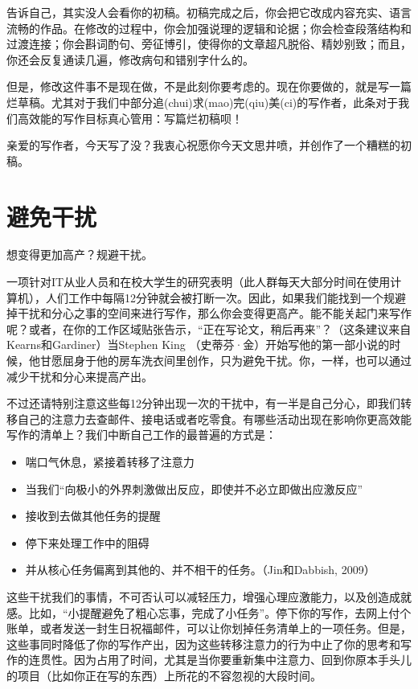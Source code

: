 \documentclass{ctexart}
\begin{document}
告诉自己，其实没人会看你的初稿。初稿完成之后，你会把它改成内容充实、语言流畅的作品。在修改的过程中，你会加强说理的逻辑和论据；你会检查段落结构和过渡连接；你会斟词酌句、旁征博引，使得你的文章超凡脱俗、精妙别致；而且，你还会反复通读几遍，修改病句和错别字什么的。

但是，修改这件事不是现在做，不是此刻你要考虑的。现在你要做的，就是写一篇烂草稿。尤其对于我们中部分追(chui)求(mao)完(qiu)美(ci)的写作者，此条对于我们高效能的写作目标真心管用：写篇烂初稿呗！

亲爱的写作者，今天写了没？我衷心祝愿你今天文思井喷，并创作了一个糟糕的初稿。

\section{避免干扰}
想变得更加高产？规避干扰。

一项针对IT从业人员和在校大学生的研究表明（此人群每天大部分时间在使用计算机），人们工作中每隔12分钟就会被打断一次。因此，如果我们能找到一个规避掉干扰和分心之事的空间来进行写作，那么你会变得更高产。能不能关起门来写作呢？或者，在你的工作区域贴张告示，“正在写论文，稍后再来”？（这条建议来自Kearns和Gardiner）当Stephen King （史蒂芬·金）开始写他的第一部小说的时候，他甘愿屈身于他的房车洗衣间里创作，只为避免干扰。你，一样，也可以通过减少干扰和分心来提高产出。

不过还请特别注意这些每12分钟出现一次的干扰中，有一半是自己分心，即我们转移自己的注意力去查邮件、接电话或者吃零食。有哪些活动出现在影响你更高效能写作的清单上？我们中断自己工作的最普遍的方式是：

\begin{itemize}
\item 喘口气休息，紧接着转移了注意力
\item 当我们“向极小的外界刺激做出反应，即使并不必立即做出应激反应”
\item 接收到去做其他任务的提醒
\item 停下来处理工作中的阻碍
\item 并从核心任务偏离到其他的、并不相干的任务。（Jin和Dabbish, 2009）
\end{itemize}

这些干扰我们的事情，不可否认可以减轻压力，增强心理应激能力，以及创造成就感。比如，“小提醒避免了粗心忘事，完成了小任务”。停下你的写作，去网上付个账单，或者发送一封生日祝福邮件，可以让你划掉任务清单上的一项任务。但是，这些事同时降低了你的写作产出，因为这些转移注意力的行为中止了你的思考和写作的连贯性。因为占用了时间，尤其是当你要重新集中注意力、回到你原本手头儿的项目（比如你正在写的东西）上所花的不容忽视的大段时间。
\end{document}
